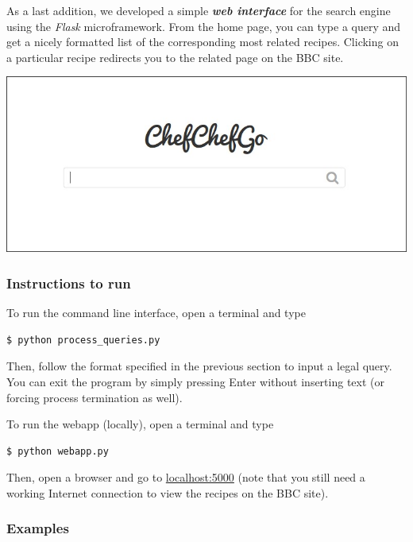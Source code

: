\medskip

\noindent As a last addition, we developed a simple \textbf{\textit{web interface}} for the search engine using the \textit{Flask}\cite{flask} microframework. From the home page, you can type a query and get a nicely formatted list of the corresponding most related recipes. Clicking on a particular recipe redirects you to the related page on the BBC site\cite{bbc}.
\begin{center}
	\vspace{5mm}
	\includegraphics[scale = 0.5]{img/homepage.jpg}
\end{center}

\bigskip

\subsubsection{Instructions to run}

To run the command line interface, open a terminal and type
\begin{lstlisting}
$ python process_queries.py
\end{lstlisting}
Then, follow the format specified in the previous section to input a legal query. You can exit the program by simply pressing Enter without inserting text (or forcing process termination as well).

\bigskip

\noindent To run the webapp (locally), open a terminal and type
\begin{lstlisting}
$ python webapp.py
\end{lstlisting}
Then, open a browser and go to \url{localhost:5000}  (note that you still need a working Internet connection to view the recipes on the BBC site\cite{bbc}).

\newpage
\subsubsection{Examples}

